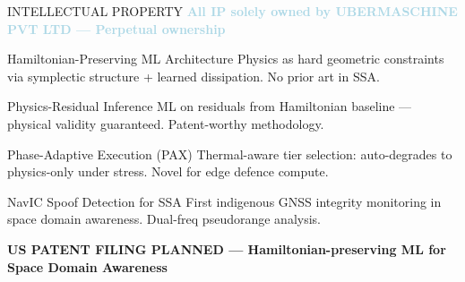 \documentclass[aspectratio=169,11pt]{beamer}
\begin{document}
\begin{frame}{INTELLECTUAL PROPERTY}
\textcolor{lightblue}{\textbf{All IP solely owned by UBERMASCHINE PVT LTD — Perpetual ownership}}

\vspace{0.3cm}
\begin{block}{Hamiltonian-Preserving ML Architecture}
\small Physics as hard geometric constraints via symplectic structure + learned dissipation. No prior art in SSA.
\end{block}
\begin{block}{Physics-Residual Inference}
\small ML on residuals from Hamiltonian baseline — physical validity guaranteed. Patent-worthy methodology.
\end{block}
\begin{block}{Phase-Adaptive Execution (PAX)}
\small Thermal-aware tier selection: auto-degrades to physics-only under stress. Novel for edge defence compute.
\end{block}
\begin{block}{NavIC Spoof Detection for SSA}
\small First indigenous GNSS integrity monitoring in space domain awareness. Dual-freq pseudorange analysis.
\end{block}

\vspace{0.3cm}
\begin{alertblock}{}
\centering\textbf{US PATENT FILING PLANNED — Hamiltonian-preserving ML for Space Domain Awareness}
\end{alertblock}
\end{frame}
\end{document}
